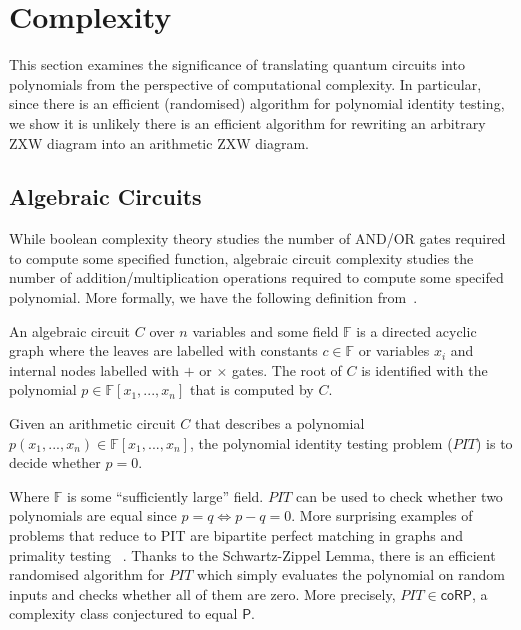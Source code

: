 \section{Complexity}

This section examines the significance of translating quantum circuits into polynomials from the perspective of computational complexity. In particular, since there is an efficient (randomised) algorithm for polynomial identity testing, we show it is unlikely there is an efficient algorithm for rewriting an arbitrary ZXW diagram into an arithmetic ZXW diagram.

\subsection{Algebraic Circuits}

While boolean complexity theory studies the number of AND/OR gates required to compute some specified function, algebraic circuit complexity studies the number of addition/multiplication operations required to compute some specifed polynomial. More formally, we have the following definition from~\cite{shpilka2010arithmetic}.

\begin{definition}
	An algebraic circuit $C$ over $n$ variables and some field $\mathbb{F}$ is a directed acyclic graph where the leaves are labelled with constants $c \in \mathbb{F}$ or variables $x_i$ and internal nodes labelled with $+$ or $\times$ gates. The root of $C$ is identified with the polynomial $p \in \mathbb{F}[x_1, ..., x_n]$ that is computed by $C$.
\end{definition}


\begin{definition}
    Given an arithmetic circuit $C$ that describes a polynomial $p(x_1, ..., x_n) \in \mathbb{F}[x_1, ..., x_n]$, the polynomial identity testing problem ($PIT$) is to decide whether $p = 0$.
\end{definition}

Where $\mathbb{F}$ is some ``sufficiently large'' field. $PIT$ can be used to check whether two polynomials are equal since $p = q \iff p-q = 0$. More surprising examples of problems that reduce to PIT are bipartite perfect matching in graphs and primality testing ~\cite{saxena2009progress}. Thanks to the Schwartz-Zippel Lemma, there is an efficient randomised algorithm for $PIT$ which simply evaluates the polynomial on random inputs and checks whether all of them are zero. More precisely, $PIT \in \mathsf{coRP}$, a complexity class conjectured to equal $\mathsf{P}$.

